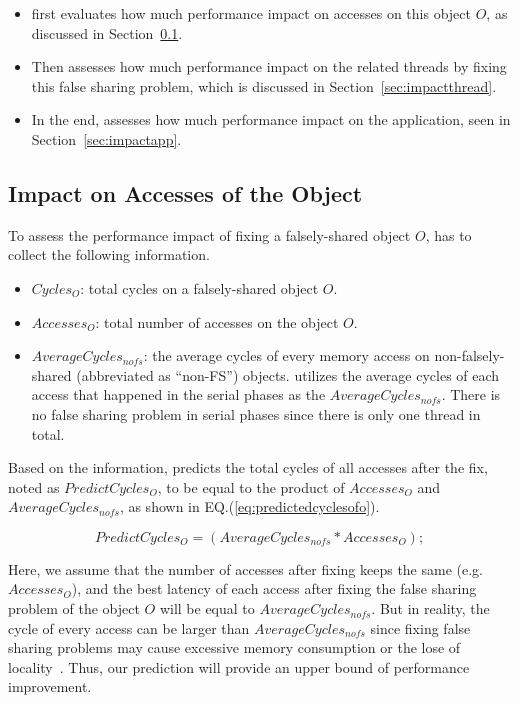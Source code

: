 \begin{itemize}
\item \cheetah{} first evaluates how much performance impact on accesses on this object $O$, as discussed in Section~\ref{sec:impactobject}. 

\item Then \cheetah{} assesses how much performance impact on the related threads by fixing this false sharing problem, which is discussed in Section~\ref{sec:impactthread}. 
 
\item In the end, \cheetah{} assesses how much performance impact on the application, seen in Section~\ref{sec:impactapp}. 
\end{itemize}


\subsection{Impact on Accesses of the Object}
\label{sec:impactobject}

To assess the performance impact of fixing a falsely-shared object $O$, \cheetah{} has to collect the following information. 
 
\begin{itemize}
\item $Cycles_O$: total cycles on a falsely-shared object $O$.
\item $Accesses_O$: total number of accesses on the object $O$.  
\item $AverageCycles_{nofs}$: the average cycles of every memory access on non-falsely-shared (abbreviated as ``non-FS'') objects. \cheetah{} utilizes the average cycles of each access that happened in the serial phases as the $AverageCycles_{nofs}$. There is no false sharing problem in serial phases since there is only one thread in total.  

\end{itemize}

Based on the information, \cheetah{} predicts the total cycles of all accesses after the fix, noted as $PredictCycles_{O}$, to be equal to  
 the product of $Accesses_O$ and $AverageCycles_{nofs}$, as shown in EQ.(\ref{eq:predictedcyclesofo}).
 
\begin{equation}
\label{eq:predictedcyclesofo}
 PredictCycles_{O} = (AverageCycles_{nofs} * Accesses_O);
\end{equation} 
 
Here, we assume that the number of accesses after fixing keeps the same (e.g. $Accesses_O$), and the best latency of each access after fixing the false sharing problem of the object $O$ will be equal to $AverageCycles_{nofs}$. But in reality, the cycle of every access can be larger than $AverageCycles_{nofs}$ since fixing false sharing problems may cause excessive memory consumption or the lose of locality~\cite{qinzhao}. Thus, our prediction will provide an upper bound of performance improvement. 


